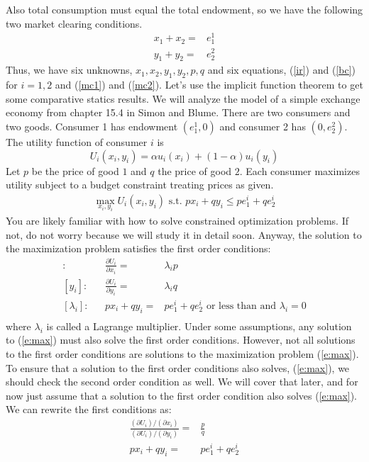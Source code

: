 Also total consumption must equal the total endowment, so we have the
following two market clearing conditions.
\begin{align}
  x_1 + x_2 = & e_1^1 \label{mc1} \\ 
  y_1 + y_2 = & e_2^2 \label{mc2}
\end{align}
Thus, we have six unknowns, $x_1, x_2, y_1, y_2, p, q$ and six
equations, (\ref{ir}) and (\ref{bc}) for $i=1,2$ and (\ref{mc1}) and
(\ref{mc2}). Let's use the implicit function theorem to get some comparative
statics results. We will analyze the model of a simple exchange
economy from chapter 15.4 in Simon and Blume. There are two consumers
and two goods. Consumer 1 has endowment $(e^1_1,0)$ and consumer 2 has
$(0,e^2_2)$. The utility function of consumer $i$ is 
\[ U_i(x_i,y_i) = \alpha u_i(x_i) + (1-\alpha) u_i(y_i) \]
Let $p$ be the price of good $1$ and $q$ the price of good $2$. Each
consumer maximizes utility subject to a budget constraint treating
prices as given.
\begin{align}
  \max_{x_i,y_i} U_i(x_i,y_i) \text{ s.t. } p x_i + q y_i \leq p
  e_1^i + q e_2^i  \label{e:max}
\end{align}
You are likely familiar with how to solve constrained optimization
problems. If not, do not worry because we will study it in detail
soon. Anyway, the solution to the maximization problem satisfies the
first order conditions:
\begin{align*}
  [x_i]: & & \frac{\partial U_i}{\partial x_i} = & \lambda_i p \\
  [y_i]: & & \frac{\partial U_i}{\partial y_i} = & \lambda_i q \\
  [\lambda_i]: & &  p x_i + q y_i = &  p e_1^i + q e_2^i  \text{ or
    less than and }
  \lambda_i = 0\\
\end{align*}
where $\lambda_i$ is called a Lagrange multiplier. Under some
assumptions, any solution to (\ref{e:max}) must also solve the first
order conditions. However, not all solutions to the first order
conditions are solutions to the maximization problem (\ref{e:max}). To
ensure that a solution to the first order conditions also solves,
(\ref{e:max}), we should check the second order condition as well. We
will cover that later, and for now just assume that a solution to the
first order condition also solves (\ref{e:max}). We can rewrite the
first conditions as:
\begin{align*}
  \frac{ (\partial U_i)/(\partial x_i) }{ (\partial U_i)/(\partial
    y_i)} = & \frac{p}{q} \\
  p x_i + q y_i = &  p e_1^i + q e_2^i
\end{align*}
